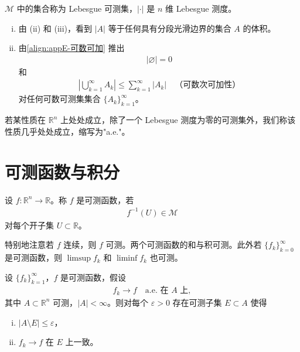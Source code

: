 \documentclass[../main.tex]{subfiles}
\begin{document}
$\mathcal{M}$ 中的集合称为 Lebesgue 可测集，$|\cdot|$ 是 $n$ 维 Lebesgue 测度。

\begin{remark}\label{remark:appE-测度注}
\begin{enumerate}[(i)]
\item 由 (ii) 和 (iii)，看到 $|A|$ 等于任何具有分段光滑边界的集合 $A$ 的体积。
\item 由\eqref{align:appE-可数可加} 推出
\begin{align}
|\varnothing |=0
\label{align:appE-空集}
\end{align}
和
\begin{align}
\left|\bigcup_{k=1}^\infty A_k\right|\leqslant\sum_{k=1}^\infty|A_k| \quad \text{（可数次可加性）}
\label{align:appE-次可加}
\end{align}
对任何可数可测集集合 $\{A_k\}_{k=1}^\infty$。
\end{enumerate}
\end{remark}

\begin{definition}\label{definition:appE-a.e.}
若某性质在 $\mathbb{R}^n$ 上处处成立，除了一个 Lebesgue 测度为零的可测集外，我们称该性质几乎处处成立，缩写为"a.e."。
\end{definition}

\section{可测函数与积分}\label{section:appE-可测函数}

\begin{definition}\label{definition:appE-可测函数}
设 $f:\mathbb{R}^n\to\mathbb{R}$。称 $f$ 是可测函数，若
\begin{align*}
f^{-1}(U)\in\mathcal{M}
\end{align*}
对每个开子集 $U\subset\mathbb{R}$。
\end{definition}

特别地注意若 $f$ 连续，则 $f$ 可测。两个可测函数的和与积可测。此外若 $\{f_k\}_{k=0}^\infty$ 是可测函数，则 $\limsup f_k$ 和 $\liminf f_k$ 也可测。

\begin{theorem}[Egoroff 定理。]\label{theorem:appE-Egoroff}设 $\{f_k\}_{k=1}^\infty$，$f$ 是可测函数，假设
\begin{align*}
f_k\to f \quad \text{a.e. 在 } A \text{ 上},
\end{align*}
其中 $A\subset\mathbb{R}^n$ 可测，$|A|<\infty$。则对每个 $\varepsilon>0$ 存在可测子集 $E\subset A$ 使得
\begin{enumerate}[(i)]
\item $|A\setminus E|\leqslant\varepsilon$，
\item $f_k\to f$ 在 $E$ 上一致。
\end{enumerate}
\end{theorem}
\end{document}

